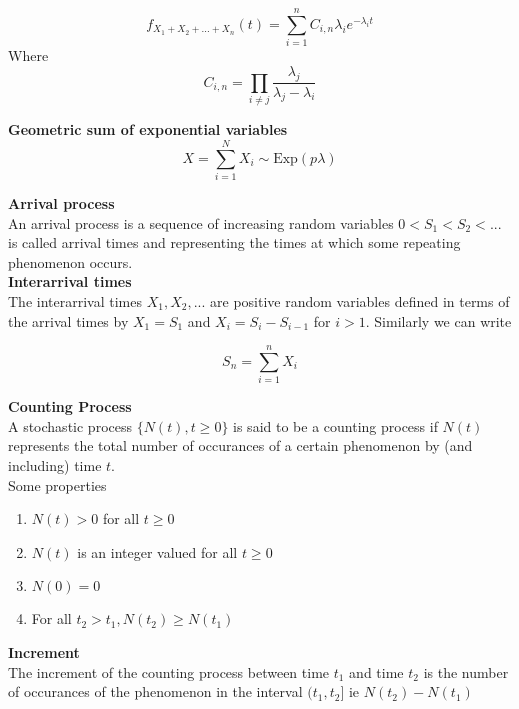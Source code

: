 $$f_{X_1 + X_2 +...+ X_n}(t) = \sum_{i=1}^n C_{i,n} \lambda_i e^{-\lambda_it}$$
Where
$$C_{i,n} = \prod_{i \neq j} \frac{\lambda_j}{\lambda_j - \lambda_i}$$

\textbf{Geometric sum of exponential variables}
$$X = \sum_{i=1}^N X_i \sim \text{Exp}(p \lambda)$$

\textbf{Arrival process}\\
An arrival process is a sequence of increasing random variables $0 < S_1 < S_2 < ...$ is called arrival times and representing the times at which some repeating phenomenon occurs.\\

\textbf{Interarrival times}\\
The interarrival times $X_1, X_2,...$ are positive random variables defined in terms of the arrival times by $X_1 = S_1$ and $X_i = S_i - S_{i-1}$ for $i > 1$. Similarly we can write

$$S_n = \sum_{i=1}^n X_i$$

\textbf{Counting Process}\\

A stochastic process $\{N(t), t \geq 0 \}$ is said to be a counting process if $N(t)$ represents the total number of occurances of a certain phenomenon by (and including) time $t$.\\

Some properties
\begin{enumerate}
	\item $N(t)>0$ for all $t \geq 0$
	\item $N(t)$ is an integer valued for all $t \geq 0$
	\item $N(0) = 0$ 
	\item For all $t_2 > t_1, N(t_2) \geq N(t_1)$
\end{enumerate}

\textbf{Increment}\\
The increment of the counting process between time $t_1$ and time $t_2$ is the number of occurances of the phenomenon in the interval $(t_1,t_2]$ ie $N(t_2) - N(t_1)$